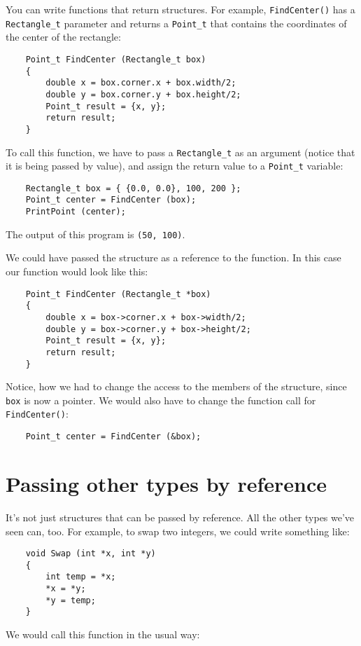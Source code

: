 You can write functions that return structures.  For example,
{\tt FindCenter()} has a {\tt Rectangle\_t} parameter and
returns a {\tt Point\_t} that contains the coordinates of the
center of the rectangle:

\begin{verbatim}
	Point_t FindCenter (Rectangle_t box)
	{
		double x = box.corner.x + box.width/2;
		double y = box.corner.y + box.height/2;
		Point_t result = {x, y};
		return result;
	}
\end{verbatim}
%
To call this function, we have to pass a {\tt Rectangle\_t} as an argument
(notice that it is being passed by value), and assign the
return value to a {\tt Point\_t} variable:

\begin{verbatim}
	Rectangle_t box = { {0.0, 0.0}, 100, 200 };
	Point_t center = FindCenter (box);
	PrintPoint (center);
\end{verbatim}
%
The output of this program is {\tt (50, 100)}.

We could have passed the structure as a reference to the
function. In this case our function would look like this:

\begin{verbatim}
	Point_t FindCenter (Rectangle_t *box)
	{
		double x = box->corner.x + box->width/2;
		double y = box->corner.y + box->height/2;
		Point_t result = {x, y};
		return result;
	}
\end{verbatim}
Notice, how we had to change the access to the members of the 
structure, since {\tt box} is now a pointer. 
We would also have to change the function call for {\tt FindCenter()}:

\begin{verbatim}
	Point_t center = FindCenter (&box);
\end{verbatim}

\section {Passing other types by reference}

It's not just structures that can be passed by reference.
All the other types we've seen can, too.  For example, to swap
two integers, we could write something like:

\begin{verbatim}
	void Swap (int *x, int *y)
	{
		int temp = *x;
		*x = *y;
		*y = temp;
	}
\end{verbatim}
%
We would call this function in the usual way:

